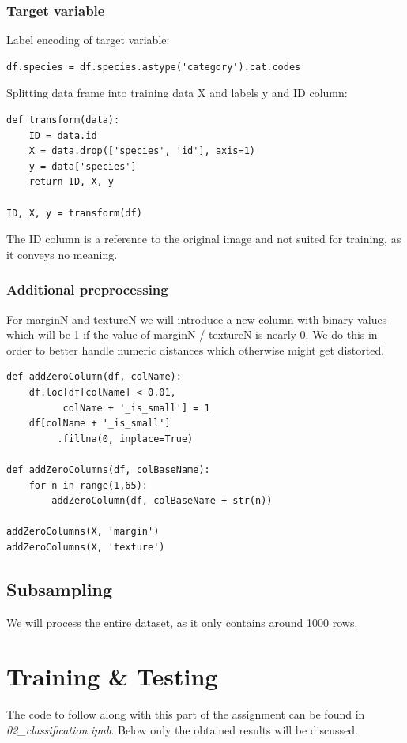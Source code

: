 \documentclass{sig-alternate-05-2015}
\begin{document}
\subsubsection{Target variable}

Label encoding of target variable:
\begin{verbatim}
df.species = df.species.astype('category').cat.codes
\end{verbatim}

Splitting data frame into training data X and labels y and ID column:
\begin{verbatim}
def transform(data):
    ID = data.id
    X = data.drop(['species', 'id'], axis=1)
    y = data['species']
    return ID, X, y

ID, X, y = transform(df)
\end{verbatim}

The ID column is a reference to the original image and not suited for training, as it conveys no meaning.

\subsubsection{Additional preprocessing}
For marginN and textureN we will introduce a new column with binary values which will be 1 if the value of marginN / textureN is nearly 0.
We do this in order to better handle numeric distances which otherwise might get distorted.

\begin{verbatim}
def addZeroColumn(df, colName):
    df.loc[df[colName] < 0.01, 
          colName + '_is_small'] = 1
    df[colName + '_is_small']
         .fillna(0, inplace=True)

def addZeroColumns(df, colBaseName):
    for n in range(1,65):
        addZeroColumn(df, colBaseName + str(n))
        
addZeroColumns(X, 'margin')
addZeroColumns(X, 'texture')
\end{verbatim}

\subsection{Subsampling}
We will process the entire dataset, as it only contains around 1000 rows.

\section{Training \& Testing}
The code to follow along with this part of the assignment can be found in \emph{02\_classification.ipnb}. Below only the obtained results will be discussed.
\end{document}

